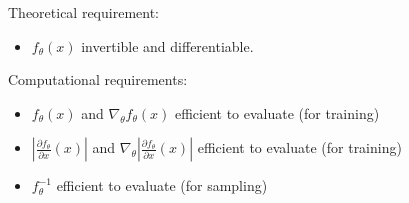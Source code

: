 \begin{concept}
    Theoretical requirement:

    \begin{itemize}
        \item $f_{\theta}(x)$ invertible and differentiable.
    \end{itemize}

    Computational requirements:

    \begin{itemize}
        \item $f_{\theta}(x)$ and $\nabla_{\theta} f_{\theta}(x)$ efficient to evaluate (for training)
        \item $\left|\frac{\partial f_{\theta}}{\partial x}(x)\right|$ and $\nabla_{\theta}\left|\frac{\partial f_{\theta}}{\partial x}(x)\right|$ efficient to evaluate (for training)
        \item $f_{\theta}^{-1}$ efficient to evaluate (for sampling)
    \end{itemize}
\end{concept}

